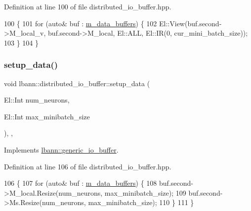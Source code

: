 Definition at line 100 of file distributed\+\_\+io\+\_\+buffer.\+hpp.


\begin{DoxyCode}
100                                                                \{
101     \textcolor{keywordflow}{for} (\textcolor{keyword}{auto}& buf : \hyperlink{classlbann_1_1distributed__io__buffer_a59ef8621c57755f73671b782e11dbe89}{m\_data\_buffers}) \{
102       El::View(buf.second->M\_local\_v, buf.second->M\_local, El::ALL, El::IR(0, cur\_mini\_batch\_size));
103     \}
104   \}
\end{DoxyCode}
\mbox{\label{classlbann_1_1distributed__io__buffer_aec36cf1d148646f0e27d5939664f02d8}} 
\subsubsection{\texorpdfstring{setup\+\_\+data()}{setup\_data()}}
{\footnotesize\ttfamily void lbann\+::distributed\+\_\+io\+\_\+buffer\+::setup\+\_\+data (\begin{DoxyParamCaption}\item[{El\+::\+Int}]{num\+\_\+neurons,  }\item[{El\+::\+Int}]{max\+\_\+minibatch\+\_\+size }\end{DoxyParamCaption})\hspace{0.3cm}{\ttfamily [inline]}, {\ttfamily [override]}, {\ttfamily [virtual]}}



Implements \hyperlink{classlbann_1_1generic__io__buffer_a00f3920147f7f19eceb5336bd6ddb421}{lbann\+::generic\+\_\+io\+\_\+buffer}.



Definition at line 106 of file distributed\+\_\+io\+\_\+buffer.\+hpp.


\begin{DoxyCode}
106                                                                         \{
107     \textcolor{keywordflow}{for} (\textcolor{keyword}{auto}& buf : \hyperlink{classlbann_1_1distributed__io__buffer_a59ef8621c57755f73671b782e11dbe89}{m\_data\_buffers}) \{
108       buf.second->M\_local.Resize(num\_neurons, max\_minibatch\_size);
109       buf.second->Ms.Resize(num\_neurons, max\_minibatch\_size);
110     \}
111   \}
\end{DoxyCode}


